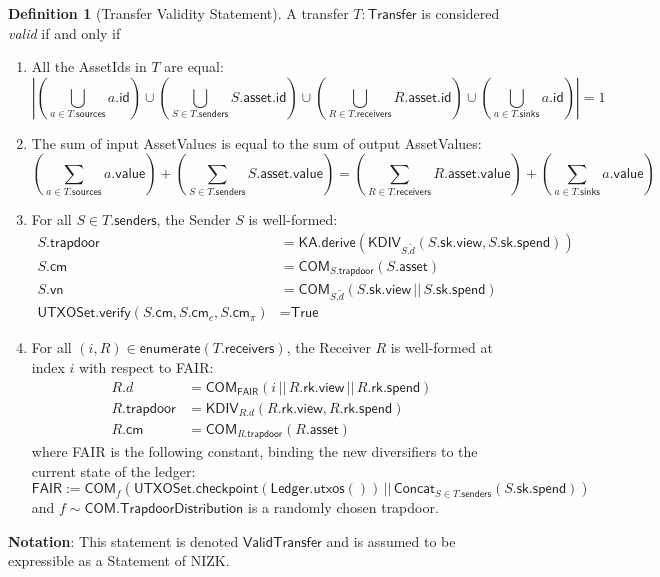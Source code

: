 \documentclass[a4paper]{article}
\theoremstyle{definition}
\newtheorem{definition}{Definition}[subsection]
\renewcommand{\abs}[1]{\left|#1\right|}
\newcommand{\AssetId}{{\textsf{AssetId}}}
\newcommand{\AssetValue}{{\textsf{AssetValue}}}
\newcommand{\COM}{{\textsf{COM}}}
\newcommand{\Concat}{{\textsf{Concat}}}
\newcommand{\Enumerate}{{\textsf{enumerate}}}
\newcommand{\FAIR}{{\textsf{FAIR}}}
\newcommand{\ID}{{\textsf{id}}}
\newcommand{\KA}{{\textsf{KA}}}
\newcommand{\KDIV}{{\textsf{KDIV}}}
\newcommand{\Ledger}{{\textsf{Ledger}}}
\newcommand{\NIZK}{{\textsf{NIZK}}}
\newcommand{\Receiver}{{\textsf{Receiver}}}
\newcommand{\Sender}{{\textsf{Sender}}}
\newcommand{\Statement}{{\textsf{Statement}}}
\newcommand{\Transfer}{{\textsf{Transfer}}}
\newcommand{\TrapdoorDistribution}{{\textsf{TrapdoorDistribution}}}
\newcommand{\True}{{\textsf{True}}}
\newcommand{\UTXOSet}{{\textsf{UTXOSet}}}
\newcommand{\VALUE}{{\textsf{value}}}
\newcommand{\ValidTransfer}{{\textsf{ValidTransfer}}}
\newcommand{\asset}{{\textsf{asset}}}
\newcommand{\checkpoint}{{\textsf{checkpoint}}}
\newcommand{\cm}{{\textsf{cm}}}
\newcommand{\derive}{{\textsf{derive}}}
\newcommand{\receivers}{{\textsf{receivers}}}
\newcommand{\rk}{{\textsf{rk}}}
\newcommand{\senders}{{\textsf{senders}}}
\newcommand{\sinks}{{\textsf{sinks}}}
\newcommand{\sk}{{\textsf{sk}}}
\newcommand{\sources}{{\textsf{sources}}}
\newcommand{\spend}{{\textsf{spend}}}
\newcommand{\trapdoor}{{\textsf{trapdoor}}}
\newcommand{\utxos}{{\textsf{utxos}}}
\newcommand{\verify}{{\textsf{verify}}}
\newcommand{\view}{{\textsf{view}}}
\newcommand{\vn}{{\textsf{vn}}}
\begin{document}
\begin{definition}[\Transfer{} Validity \Statement{}]\label{def:transfer-validity-statement}
    A transfer $T : \Transfer$ is considered \emph{valid} if and only if
    \begin{enumerate}
        \item All the \AssetId{s} in $T$ are equal:
            \[
                \abs{
                    \left(\bigcup_{a \in T.\sources} a.\ID \right)
                    \cup
                    \left(\bigcup_{S \in T.\senders} S.\asset.\ID \right)
                    \cup
                    \left(\bigcup_{R \in T.\receivers} R.\asset.\ID \right)
                    \cup
                    \left(\bigcup_{a \in T.\sinks} a.\ID \right)
                } = 1
            \]
        \item The sum of input \AssetValue{s} is equal to the sum of output \AssetValue{s}:
            \[
                \left(\sum_{a \in T.\sources} a.\VALUE\right)
                +
                \left(\sum_{S \in T.\senders} S.\asset.\VALUE\right)
                =
                \left(\sum_{R \in T.\receivers} R.\asset.\VALUE\right)
                +
                \left(\sum_{a \in T.\sinks} a.\VALUE\right)
            \]
        \item For all $S \in T.\senders$, the \Sender{} $S$ is well-formed:
            \begin{align*}
                S.\trapdoor                                 &= \KA.\derive(\KDIV_{S.\tilde{d}}(S.\sk.\view, S.\sk.\spend)) \\
                S.\cm                                       &= \COM_{S.\trapdoor}(S.\asset) \\
                S.\vn                                       &= \COM_{S.\tilde{d}}(S.\sk.\view \,||\, S.\sk.\spend) \\
                \UTXOSet.\verify(S.\cm, S.\cm_c, S.\cm_\pi) &= \True
            \end{align*}
        \item For all $(i, R) \in \Enumerate(T.\receivers)$, the \Receiver{} $R$ is well-formed at index $i$ with respect to \FAIR{}:
            \begin{align*}
                R.d         &= \COM_{\FAIR}(i \,||\, R.\rk.\view \,||\, R.\rk.\spend) \\
                R.\trapdoor &= \KDIV_{R.d}(R.\rk.\view, R.\rk.\spend) \\
                R.\cm       &= \COM_{R.\trapdoor}(R.\asset)
            \end{align*}
            where \FAIR{} is the following constant, binding the new diversifiers to the current state of the ledger:
            \[\FAIR := \COM_f(\UTXOSet.\checkpoint(\Ledger.\utxos()) \,||\, \Concat_{S \in T.\senders}(S.\sk.\spend))\]
            and $f \sim \COM.\TrapdoorDistribution$ is a randomly chosen trapdoor.
    \end{enumerate}
    \textbf{Notation}: This statement is denoted $\ValidTransfer$ and is assumed to be expressible as a \Statement{} of \NIZK{}.
\end{definition}
\end{document}
